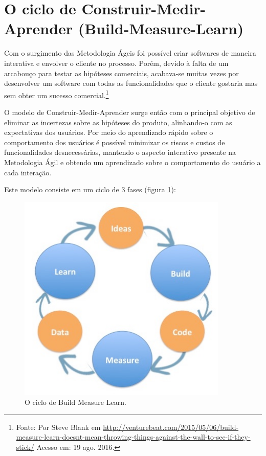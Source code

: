 \section{O ciclo de Construir-Medir-Aprender (Build-Measure-Learn)}
\par Com o surgimento das Metodologia Ágeis foi possível criar softwares de maneira interativa e envolver o cliente no processo. Porém, devido à falta de um arcabouço para testar as hipóteses comerciais, acabava-se muitas vezes por desenvolver um software com todas as funcionalidades que o cliente gostaria mas sem obter um sucesso comercial.\footnote{Fonte: Por Steve Blank em \url{http://venturebeat.com/2015/05/06/build-measure-learn-doesnt-mean-throwing-things-against-the-wall-to-see-if-they-stick/} Acesso em: 19 ago. 2016.}
\par O modelo de Construir-Medir-Aprender surge então com o principal objetivo de eliminar as incertezas sobre as hipóteses do produto, alinhando-o com as expectativas dos usuários. Por meio do aprendizado rápido sobre o comportamento dos usuários é possível minimizar os riscos e custos de funcionalidades desnecessárias, mantendo o aspecto interativo presente na Metodologia Ágil e obtendo um aprendizado sobre o comportamento do usuário a cada interação.
\par Este modelo consiste em um ciclo de 3 fases (figura \ref{fig:buildmeasurelearn}):
\begin{figure}[htb]
\centering
\includegraphics[width=10cm]{figuras/buildmeasurelearn}
\caption{\label{fig:buildmeasurelearn}O ciclo de Build Measure Learn.}
\end{figure}

